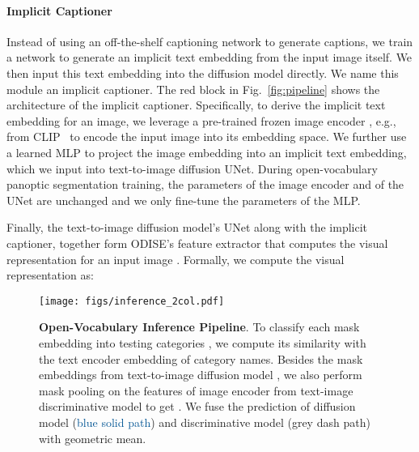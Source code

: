 \documentclass[10pt,twocolumn,letterpaper]{article}
\newcommand{\ourmethod}{ODISE}
\begin{document}
\paragraph{Implicit Captioner}
Instead of using an off-the-shelf captioning network to generate captions, we train a network to generate an implicit text embedding from the input image itself. We then input this text embedding into the diffusion model directly.
We name this module an implicit captioner.
The red block in Fig.~\ref{fig:pipeline} shows the architecture of the implicit captioner.
Specifically, to derive the implicit text embedding for an image, we leverage a pre-trained frozen image encoder , e.g., from CLIP~\cite{radford2021clip} to encode the input image  into its embedding space. 
We further use a learned MLP to project the image embedding into an implicit text embedding, which we input into text-to-image diffusion UNet. During open-vocabulary panoptic segmentation training, the parameters of the image encoder and of the UNet are unchanged and we only fine-tune the parameters of the MLP.

Finally, the text-to-image diffusion model's UNet along with the implicit captioner, together form \ourmethod{}'s feature extractor that computes the visual representation  for an input image . Formally, we compute the visual representation  as:



\begin{figure*}[t]
    \centering
    \texttt{[image: figs/inference\_2col.pdf]}
    \vspace{-1.5em}
    \caption{
        \textbf{Open-Vocabulary Inference Pipeline}.  
        To classify each mask embedding into testing categories , we compute its similarity with the text encoder  embedding of category names.
        Besides the mask embeddings from text-to-image diffusion model , we also perform mask pooling on the features of image encoder  from text-image discriminative model to get .
        We fuse the prediction of diffusion model (\textcolor[HTML]{005493}{blue solid path}) and discriminative model (\textcolor[HTML]{7E7E7E}{grey dash path}) with geometric mean. 
    }
    \vspace{-.5em}
    \label{fig:inference}
\end{figure*}
\end{document}
